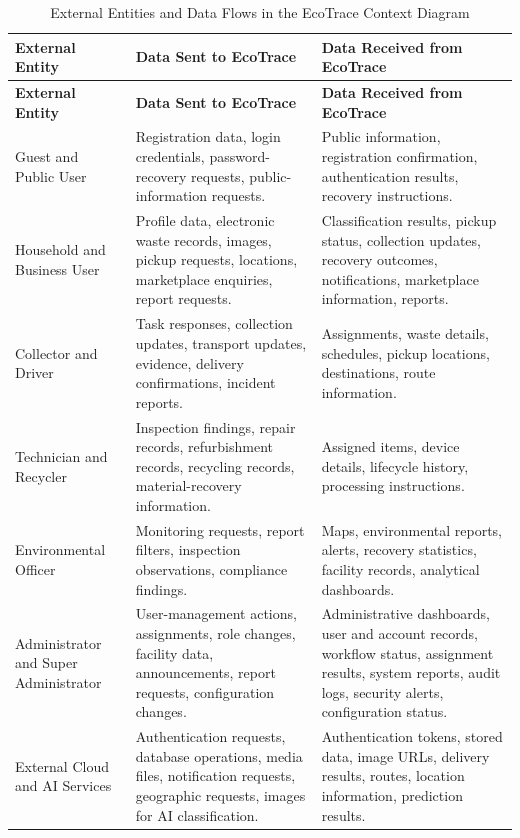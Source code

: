 \begin{longtable}{@{}p{3.1cm}p{5cm}p{5.3cm}@{}}
\caption{External Entities and Data Flows in the EcoTrace Context Diagram} \label{tab:context-dfd} \\
\toprule \textbf{External Entity} & \textbf{Data Sent to EcoTrace} & \textbf{Data Received from EcoTrace} \\ \midrule
\endfirsthead
\toprule \textbf{External Entity} & \textbf{Data Sent to EcoTrace} & \textbf{Data Received from EcoTrace} \\ \midrule
\endhead
Guest and Public User & Registration data, login credentials, password-recovery requests, public-information requests. & Public information, registration confirmation, authentication results, recovery instructions. \\
Household and Business User & Profile data, electronic waste records, images, pickup requests, locations, marketplace enquiries, report requests. & Classification results, pickup status, collection updates, recovery outcomes, notifications, marketplace information, reports. \\
Collector and Driver & Task responses, collection updates, transport updates, evidence, delivery confirmations, incident reports. & Assignments, waste details, schedules, pickup locations, destinations, route information. \\
Technician and Recycler & Inspection findings, repair records, refurbishment records, recycling records, material-recovery information. & Assigned items, device details, lifecycle history, processing instructions. \\
Environmental Officer & Monitoring requests, report filters, inspection observations, compliance findings. & Maps, environmental reports, alerts, recovery statistics, facility records, analytical dashboards. \\
Administrator and Super Administrator & User-management actions, assignments, role changes, facility data, announcements, report requests, configuration changes. & Administrative dashboards, user and account records, workflow status, assignment results, system reports, audit logs, security alerts, configuration status. \\
External Cloud and AI Services & Authentication requests, database operations, media files, notification requests, geographic requests, images for AI classification. & Authentication tokens, stored data, image URLs, delivery results, routes, location information, prediction results. \\
\bottomrule
\end{longtable}

